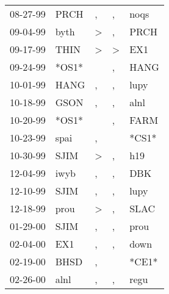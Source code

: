\begin{supertabular}{p{0.07\textwidth}p{0.06\textwidth}p{0.02\textwidth}p{0.02\textwidth}p{0.06\textwidth}}
 08-27-99\textsuperscript{} &  PRCH\textsuperscript{} &                , &             , &           noqs\textsuperscript{} \\
 09-04-99\textsuperscript{} &  byth\textsuperscript{} &     \textgreater &             , &           PRCH\textsuperscript{} \\
 09-17-99\textsuperscript{} &  THIN\textsuperscript{} &     \textgreater &  \textgreater &            EX1\textsuperscript{} \\
 09-24-99\textsuperscript{} &                   *OS1* &                  &             , &           HANG\textsuperscript{} \\
 10-01-99\textsuperscript{} &  HANG\textsuperscript{} &                , &             , &           lupy\textsuperscript{} \\
 10-18-99\textsuperscript{} &  GSON\textsuperscript{} &                , &             , &           alnl\textsuperscript{} \\
 10-20-99\textsuperscript{} &                   *OS1* &                  &             , &           FARM\textsuperscript{} \\
 10-23-99\textsuperscript{} &  spai\textsuperscript{} &                , &               &                            *CS1* \\
 10-30-99\textsuperscript{} &  SJIM\textsuperscript{} &     \textgreater &             , &            h19\textsuperscript{} \\
 12-04-99\textsuperscript{} &  iwyb\textsuperscript{} &                , &             , &            DBK\textsuperscript{} \\
 12-10-99\textsuperscript{} &  SJIM\textsuperscript{} &                , &             , &           lupy\textsuperscript{} \\
 12-18-99\textsuperscript{} &  prou\textsuperscript{} &     \textgreater &             , &           SLAC\textsuperscript{} \\
 01-29-00\textsuperscript{} &  SJIM\textsuperscript{} &                , &             , &           prou\textsuperscript{} \\
 02-04-00\textsuperscript{} &   EX1\textsuperscript{} &                , &             , &           down\textsuperscript{} \\
 02-19-00\textsuperscript{} &  BHSD\textsuperscript{} &                , &               &                            *CE1* \\
 02-26-00\textsuperscript{} &  alnl\textsuperscript{} &                , &             , &           regu\textsuperscript{} \\

\end{supertabular}
